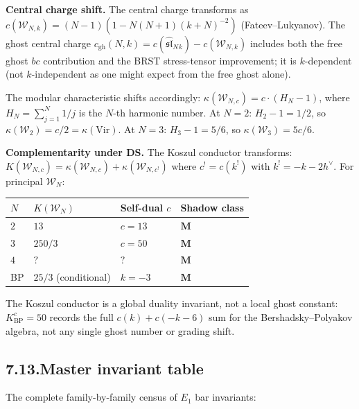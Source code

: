 \documentclass[11pt,reqno]{amsart}
\theoremstyle{definition}
\theoremstyle{remark}
\providecommand{\cW}{\mathcal{W}}
\providecommand{\Vir}{\mathrm{Vir}}
\providecommand{\gh}{\mathrm{gh}}
\numberwithin{equation}{section}
\begin{document}
\medskip\noindent\textbf{Central charge shift.}\enspace
The central charge transforms as
$c(\cW_{N,k}) = (N-1)(1 - N(N+1)(k+N)^{-2})$ (Fateev--Lukyanov).
The ghost central charge
$c_{\gh}(N,k) = c(\widehat{\mathfrak{sl}}_N{}_k) - c(\cW_{N,k})$
includes both the free ghost $bc$ contribution and the BRST
stress-tensor improvement; it is $k$-dependent (not $k$-independent
as one might expect from the free ghost alone).

The modular characteristic shifts accordingly:
$\kappa(\cW_{N,c}) = c \cdot (H_N - 1)$, where
$H_N = \sum_{j=1}^{N} 1/j$ is the $N$-th harmonic number.
At $N = 2$: $H_2 - 1 = 1/2$, so $\kappa(\cW_2) = c/2 = \kappa(\Vir)$.
At $N = 3$: $H_3 - 1 = 5/6$, so $\kappa(\cW_3) = 5c/6$.

\medskip\noindent\textbf{Complementarity under DS.}\enspace
The Koszul conductor transforms: $K(\cW_{N,c}) = \kappa(\cW_{N,c})
+ \kappa(\cW_{N,c^!})$ where $c^! = c(k^!)$ with
$k^! = -k - 2h^\vee$. For principal $\cW_N$:
\begin{center}
\renewcommand{\arraystretch}{1.15}
\begin{tabular}{llll}
$N$ & $K(\cW_N)$ & Self-dual $c$ & Shadow class\\ \hline
$2$ & $13$ & $c = 13$ & $\mathbf M$\\
$3$ & $250/3$ & $c = 50$ & $\mathbf M$\\
$4$ & $?$ & $?$ & $\mathbf M$\\
BP & $25/3$ (conditional) & $k = -3$ & $\mathbf M$
\end{tabular}
\end{center}
The Koszul conductor is a global duality invariant, not a local
ghost constant: $K^c_{\mathrm{BP}} = 50$ records the full
$c(k) + c(-k-6)$ sum for the Bershadsky--Polyakov algebra, not any
single ghost number or grading shift.

\subsection*{7.13.\quad Master invariant table}

The complete family-by-family census of $E_1$ bar invariants:
\end{document}
